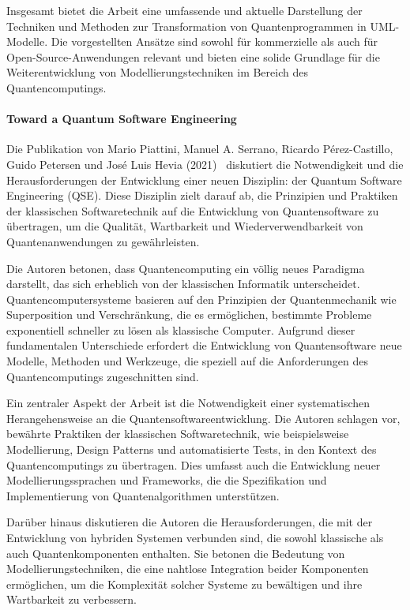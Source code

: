 Insgesamt bietet die Arbeit eine umfassende und aktuelle Darstellung der Techniken und Methoden zur Transformation von 
Quantenprogrammen in UML-Modelle. Die vorgestellten Ansätze sind sowohl für kommerzielle als auch für Open-Source-Anwendungen 
relevant und bieten eine solide Grundlage für die Weiterentwicklung von Modellierungstechniken im Bereich des Quantencomputings.

\paragraph{Toward a Quantum Software Engineering}

Die Publikation von Mario Piattini, Manuel A. Serrano, Ricardo Pérez-Castillo, Guido Petersen und José Luis Hevia (2021)~\cite{Piattini_2021} 
diskutiert die Notwendigkeit und die Herausforderungen der Entwicklung einer neuen Disziplin: der Quantum Software 
Engineering (QSE). Diese Disziplin zielt darauf ab, die Prinzipien und Praktiken der klassischen Softwaretechnik 
auf die Entwicklung von Quantensoftware zu übertragen, um die Qualität, Wartbarkeit und Wiederverwendbarkeit von 
Quantenanwendungen zu gewährleisten.

Die Autoren betonen, dass Quantencomputing ein völlig neues Paradigma darstellt, das sich erheblich von der 
klassischen Informatik unterscheidet. Quantencomputersysteme basieren auf den Prinzipien der Quantenmechanik 
wie Superposition und Verschränkung, die es ermöglichen, bestimmte Probleme exponentiell schneller zu lösen als 
klassische Computer. Aufgrund dieser fundamentalen Unterschiede erfordert die Entwicklung von Quantensoftware neue 
Modelle, Methoden und Werkzeuge, die speziell auf die Anforderungen des Quantencomputings zugeschnitten sind.

Ein zentraler Aspekt der Arbeit ist die Notwendigkeit einer systematischen Herangehensweise an die 
Quantensoftwareentwicklung. Die Autoren schlagen vor, bewährte Praktiken der klassischen Softwaretechnik, wie 
beispielsweise Modellierung, Design Patterns und automatisierte Tests, in den Kontext des Quantencomputings zu 
übertragen. Dies umfasst auch die Entwicklung neuer Modellierungssprachen und Frameworks, die die Spezifikation 
und Implementierung von Quantenalgorithmen unterstützen.

Darüber hinaus diskutieren die Autoren die Herausforderungen, die mit der Entwicklung von hybriden Systemen verbunden 
sind, die sowohl klassische als auch Quantenkomponenten enthalten. Sie betonen die Bedeutung von Modellierungstechniken, 
die eine nahtlose Integration beider Komponenten ermöglichen, um die Komplexität solcher Systeme zu bewältigen und 
ihre Wartbarkeit zu verbessern.

